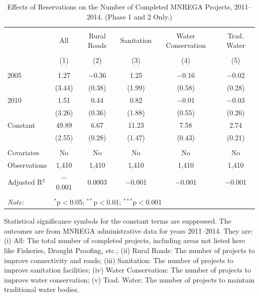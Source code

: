 \begin{table}[!htbp]
\centering
\begin{threeparttable}

  \caption{Effects of Reservations on the Number of Completed MNREGA Projects, 2011--2014. (Phase 1 and 2 Only.)} 
  \label{main_mnrega_phase_1_2} 
\scriptsize 
\begin{tabular}{@{\extracolsep{0pt}}lccccc} 
\\[-1.8ex]\hline 
\hline \\[-1.8ex] 
 & All & Rural Roads & Sanitation & Water Conservation & Trad. Water \\ 
\\[-1.8ex] & (1) & (2) & (3) & (4) & (5)\\ 
\hline \\[-1.8ex] 
 2005 & 1.27 & $-$0.36 & 1.25 & $-$0.16 & $-$0.02 \\ 
  & (3.44) & (0.38) & (1.99) & (0.58) & (0.28) \\ 
  2010 & 1.51 & 0.44 & 0.82 & $-$0.01 & $-$0.03 \\ 
  & (3.26) & (0.36) & (1.88) & (0.55) & (0.26) \\ 
  Constant & 49.89 & 6.67 & 11.23 & 7.58 & 2.74 \\ 
  & (2.55) & (0.28) & (1.47) & (0.43) & (0.21) \\ 
 \hline \\[-1.8ex] 
Covariates & No & No & No & No & No \\ 
Observations & 1,410 & 1,410 & 1,410 & 1,410 & 1,410 \\ 
Adjusted R$^{2}$ & $-$0.001 & 0.0003 & $-$0.001 & $-$0.001 & $-$0.001 \\ 
\hline 
\hline \\[-1.8ex] 
\textit{Note:}  & \multicolumn{5}{l}{$^{*}$p$<$0.05; $^{**}$p$<$0.01; $^{***}$p$<$0.001} \\ 
\end{tabular} 
\begin{tablenotes}[flushleft]
\scriptsize
\item[] Statistical significance symbols for the constant terms are suppressed. The outcomes are from MNREGA administrative data for years 2011--2014. They are: 
(i) All: The total number of completed projects, including areas not listed here like Fisheries, Drought Proofing, etc.;
(ii) Rural Roads: The number of projects to improve connectivity and roads;
(iii) Sanitation: The number of projects to improve sanitation facilities;
(iv) Water Conservation: The number of projects to improve water conservation;
(v) Trad. Water: The number of projects to maintain traditional water bodies.
\end{tablenotes}
\end{threeparttable}
\end{table}
